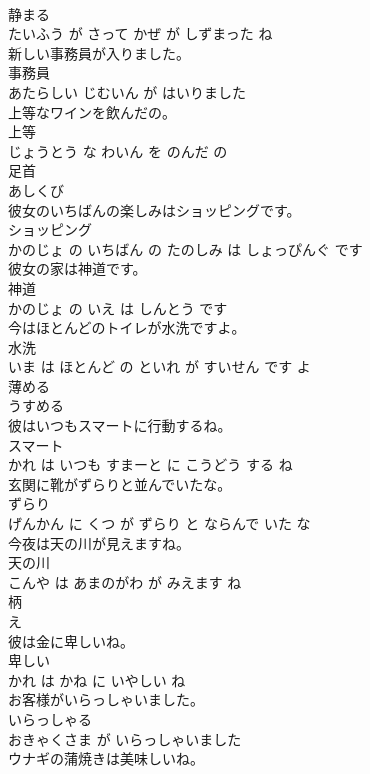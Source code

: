 \documentclass[8pt]{extreport}
\begin{document}
\begin{CJK}{UTF8}{min}
\\	静まる 
\\	たいふう が さって かぜ が しずまった ね			
\\	新しい事務員が入りました。	
\\	事務員 
\\	あたらしい じむいん が はいりました			
\\	上等なワインを飲んだの。	
\\	上等 
\\	じょうとう な わいん を のんだ の			
\\	足首	
\\	あしくび			
\\	彼女のいちばんの楽しみはショッピングです。	
\\	ショッピング 
\\	かのじょ の いちばん の たのしみ は しょっぴんぐ です			
\\	彼女の家は神道です。	
\\	神道 
\\	かのじょ の いえ は しんとう です			
\\	今はほとんどのトイレが水洗ですよ。	
\\	水洗 
\\	いま は ほとんど の といれ が すいせん です よ			
\\	薄める	
\\	うすめる			
\\	彼はいつもスマートに行動するね。	
\\	スマート 
\\	かれ は いつも すまーと に こうどう する ね			
\\	玄関に靴がずらりと並んでいたな。	
\\	ずらり 
\\	げんかん に くつ が ずらり と ならんで いた な			
\\	今夜は天の川が見えますね。	
\\	天の川 
\\	こんや は あまのがわ が みえます ね			
\\	柄	
\\	え			
\\	彼は金に卑しいね。	
\\	卑しい 
\\	かれ は かね に いやしい ね			
\\	お客様がいらっしゃいました。	
\\	いらっしゃる 
\\	おきゃくさま が いらっしゃいました			
\\	ウナギの蒲焼きは美味しいね。	

\end{CJK}
\end{document}
